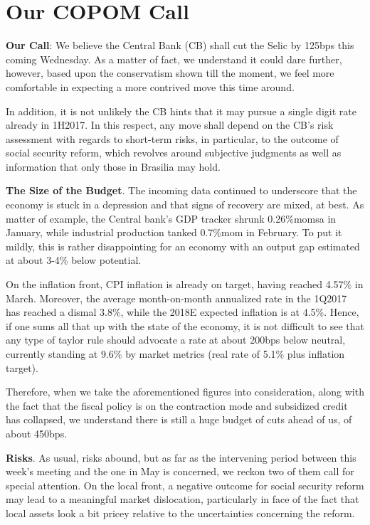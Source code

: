 \documentclass{report}
\begin{document}
\section{Our COPOM Call}
\label{sec:orgc2ab3ef}
\begin{compactitem}[$\diamond$]
\item \textbf{Our Call}: We believe the Central Bank (CB) shall cut the Selic by
125bps this coming Wednesday. As a matter of fact, we understand it
could dare further, however, based upon the conservatism shown till
the moment, we feel more comfortable in expecting a more contrived
move this time around.

In addition, it is not unlikely the CB hints that it may pursue a
single digit rate already in 1H2017. In this respect, any move shall
depend on the CB's risk assessment with regards to short-term risks,
in particular, to the outcome of social security reform, which
revolves around subjective judgments as well as information that
only those in Brasilia may hold.

\item \textbf{The Size of the Budget}. The incoming data continued to underscore
that the economy is stuck in a depression and that signs of recovery
are mixed, at best. As matter of example, the Central bank's GDP
tracker shrunk 0.26\%momsa in January, while industrial production
tanked 0.7\%mom in February. To put it mildly, this is rather
disappointing for an economy with an output gap estimated at about
3-4\% below potential.

On the inflation front, CPI inflation is already on target, having
reached 4.57\% in March. Moreover, the average month-on-month
annualized rate in the 1Q2017 has reached a dismal 3.8\%, while the
2018E expected inflation is at 4.5\%. Hence, if one sums all that up
with the state of the economy, it is not difficult to see that any
type of taylor rule should advocate a rate at about 200bps below
neutral, currently standing at 9.6\% by market metrics (real rate of
5.1\% plus inflation target).

Therefore, when we take the aforementioned figures into
consideration, along with the fact that the fiscal policy is on the
contraction mode and subsidized credit has collapsed, we understand
there is still a huge budget of cuts ahead of us, of about 450bps.

\item \textbf{Risks}. As usual, risks abound, but as far as the intervening
period between this week's meeting and the one in May is concerned,
we reckon two of them call for special attention. On the local
front, a negative outcome for social security reform may lead to a
meaningful market dislocation, particularly in face of the fact that
local assets look a bit pricey relative to the uncertainties
concerning the reform.


\end{compactitem}
\end{document}

